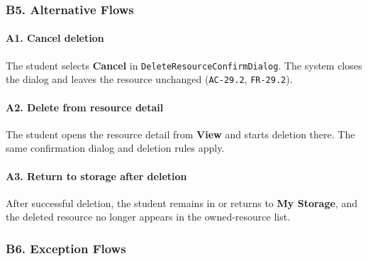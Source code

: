 \documentclass[12pt]{article}
\begin{document}
\hypertarget{sec:b5-alternative-flows}{}
\subsubsection*{B5. Alternative Flows}
\par\medskip

\hypertarget{sec:a1-cancel-deletion}{}
\paragraph*{A1. Cancel deletion}
\par\medskip

The student selects \textbf{Cancel} in \texttt{DeleteResourceConfirmDialog}. The system closes the dialog and leaves the resource unchanged (\texttt{AC-29.2}, \texttt{FR-29.2}).
\par\medskip

\hypertarget{sec:a2-delete-from-resource-detail}{}
\paragraph*{A2. Delete from resource detail}
\par\medskip

The student opens the resource detail from \textbf{View} and starts deletion there. The same confirmation dialog and deletion rules apply.
\par\medskip

\hypertarget{sec:a3-return-to-storage-after-deletion}{}
\paragraph*{A3. Return to storage after deletion}
\par\medskip

After successful deletion, the student remains in or returns to \textbf{My Storage}, and the deleted resource no longer appears in the owned-resource list.
\par\medskip

\hypertarget{sec:b6-exception-flows}{}
\subsubsection*{B6. Exception Flows}
\par\medskip

\hypertarget{sec:e1-student-does-not-own-the-resource}{}
\end{document}
